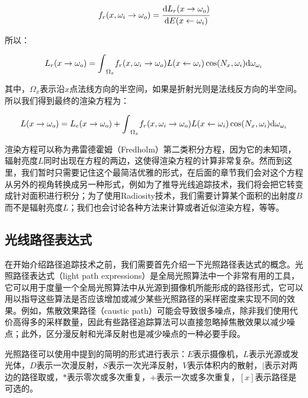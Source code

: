\begin{equation}
	f_r(x,\omega_i\to\omega_o)= \cfrac{{\rm d}L_r(x\to\omega_o)}{{\rm d}E(x\leftarrow\omega_i)}
\end{equation}

\noindent 所以：

\begin{equation}
	L_r(x\to\omega_o)={\rm \int}_{\Omega_x} f_r(x,\omega_i\to\omega_o)L(x\leftarrow\omega_i)\cos(N_x,\omega_i){\rm d}\omega_{\omega_i}
\end{equation}

\noindent 其中，$\Omega_x$表示沿$x$点法线方向的半空间，如果是折射光则是法线反方向的半空间。所以我们得到最终的渲染方程为：

\begin{equation}
	L(x\to\omega_o)=L_e(x\to\omega_o)+{\rm \int}_{\Omega_x} f_r(x,\omega_i\to\omega_o)L(x\leftarrow\omega_i)\cos(N_x,\omega_i){\rm d}\omega_{\omega_i}
\end{equation}

渲染方程可以称为弗雷德霍姆（Fredholm）第二类积分方程，因为它的未知项，辐射亮度$L$同时出现在方程的两边，这使得渲染方程的计算非常复杂。然而到这里，我们暂时只需要记住这个最简洁优雅的形式，在后面的章节我们会对这个方程从另外的视角转换成另一种形式，例如为了推导光线追踪技术，我们将会把它转变成针对面积进行积分；为了使用Radiosity技术，我们需要计算某个面积的出射度$B$而不是辐射亮度$L$；我们也会讨论各种方法来计算或者近似渲染方程，等等。



\subsection{光线路径表达式}
在开始介绍路径追踪技术之前，我们需要首先介绍一下光照路径表达式的概念。光照路径表达式（light path expressions）是全局光照算法中一个非常有用的工具，它可以用于度量一个全局光照算法中从光源到摄像机所能形成的路径形式，它可以用以指导这些算法是否应该增加或减少某些光照路径的采样密度来实现不同的效果。例如，焦散效果路径（caustic path）可能会导致很多噪点，除非我们使用代价高得多的采样数量，因此有些路径追踪算法可以直接忽略掉焦散效果以减少噪点；此外，区分漫反射和光泽反射也是减少噪点的一种必要手段。

光照路径可以使用\cite{a:Adaptiveradiositytexturesforbidirectionalraytracing}中提到的简明的形式进行表示：$E$表示摄像机，$L$表示光源或发光体，$D$表示一次漫反射，$S$表示一次光泽反射，$V$表示体积内的散射，$|$表示对两边的路径取或，$*$表示零次或多次重复，$+$表示一次或多次重复，$[x]$表示路径是可选的。

